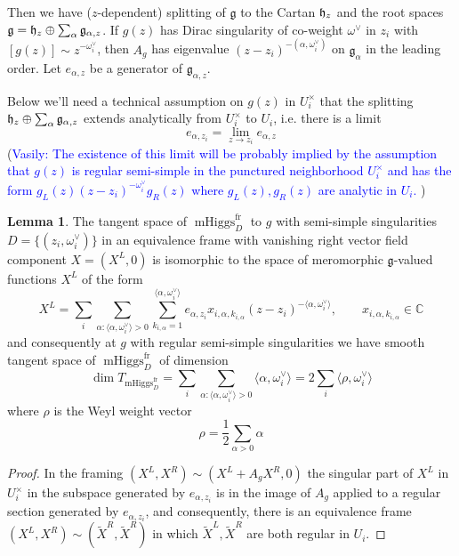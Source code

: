 \documentclass[11pt, oneside, reqno]{amsart}
\theoremstyle{definition} \newtheorem{definition}{Definition}[section]
\newtheorem{lemma}[definition]{Lemma}
\theoremstyle{definition} \newtheorem{remark}[definition]{Remark}
\theoremstyle{definition} \newtheorem{remarks}[definition]{Remarks}
\theoremstyle{definition} \newtheorem{question}[definition]{Question}
\theoremstyle{definition} \newtheorem*{note}{Note}
\theoremstyle{definition} \newtheorem{example}[definition]{Example}
\theoremstyle{definition} \newtheorem{examples}[definition]{Examples}
\renewcommand{\gg}{\mathfrak{g}}
\DeclareMathOperator{\mhiggs}{mHiggs}
\newcommand{\fr}{\mathrm{fr}}
\newcommand{\vasily}[1]{(\textcolor{blue}{Vasily: #1})}
\begin{document}
Then we have ($z$-dependent) splitting of $\gg$ to the Cartan $\mathfrak{h}_z$ and the root spaces 
$\gg = \hh_{z} \oplus \sum_{\alpha} \gg_{\alpha,z}$. 
If $g(z)$ has Dirac singularity of co-weight $\omega^{\vee}$ in $z_i$ with $[g(z) ] \sim z^{-\omega_i^{\vee}}$, then  $A_{g}$ has eigenvalue $ (z - z_i)^{- (\alpha, \omega^{\vee}_{i})}$ on $\gg_{\alpha}$
in the leading order. Let $e_{\alpha, z}$ be a generator of $\gg_{\alpha, z}$.

Below we'll need a technical assumption on $g(z)$ in $U_{i}^{\times}$ that the splitting
$\hh_{z} \oplus \sum_{\alpha} \gg_{\alpha,z}$ extends analytically from $U_{i}^{\times}$ to $U_{i}$,
i.e. there is a limit 
 \[ e_{\alpha, z_i} = \lim_{z \to z_i} e_{\alpha, z}\] 
\vasily{The existence of this limit will be probably implied by the
  assumption that $g(z)$ is regular semi-simple in the punctured
  neighborhood $U_{i}^{\times}$ and has the form $ g_L(z) (z-z_i)^{-\omega_{i}^{\vee}} g_{R}(z)$
  where $g_{L}(z), g_{R}(z)$ are analytic in $U_i$. }


\begin{lemma}
  The tangent space of $\mhiggs^{\fr}_{D}$ to $g$ with semi-simple singularities 
  $D = \{(z_i, \omega^{\vee}_{i})\}$ in an equivalence frame with
  vanishing right vector field component $X = (X^{L}, 0)$ is isomorphic to the
  space of meromorphic $\gg$-valued functions $X^{L}$ of the form
  \begin{equation}
\label{eq:XL}
    X^{L} = \sum_{i} \sum_{\alpha: \langle \alpha, \omega_i^{\vee} \rangle > 0 }
    \sum_{k_{i, \alpha} = 1}^{ \langle \alpha , \omega_i^{\vee} \rangle} e_{\alpha,{z_i}} x_{i, \alpha, k_{i, \alpha}} (z - z_i)^{-\langle \alpha, \omega_i^{\vee}\rangle }, \qquad x_{i, \alpha, k_{i, \alpha}} \in \mathbb{C}
  \end{equation}
  and consequently at $g$ with regular semi-simple singularities we have smooth
  tangent space of $\mhiggs^{\fr}_{D}$ of dimension 
  \begin{equation}
\dim T_{\mhiggs^{\fr}_{D}} = \sum_{i} \sum_{\alpha: \langle \alpha, \omega_i^{\vee} \rangle > 0 } \langle \alpha, \omega_i^{\vee} \rangle = 2 \sum_{i} \langle \rho, \omega^{\vee}_i\rangle 
  \end{equation}
  where $\rho$ is the Weyl weight vector
  \begin{equation}
    \rho = \frac 1 2 \sum_{\alpha > 0} \alpha 
  \end{equation}
\end{lemma}
\begin{proof}
  In the framing $(X^{L}, X^{R}) \sim (X^{L} + A_{g} X^{R}, 0 )$ the singular
  part of $X^{L}$ in $U_{i}^{\times}$ in the subspace generated by $e_{\alpha, z_i}$
  is in the image of $A_{g}$ applied to a regular section generated by $e_{\alpha, z_i}$,
  and consequently, there is an equivalence frame $(X^{L}, X^{R}) \sim (\tilde X^{R}, \tilde X^{R})$   in which $\tilde X^{L}, \tilde X^{R}$ are both regular in $U_{i}$. 
\end{proof}
\end{document}
